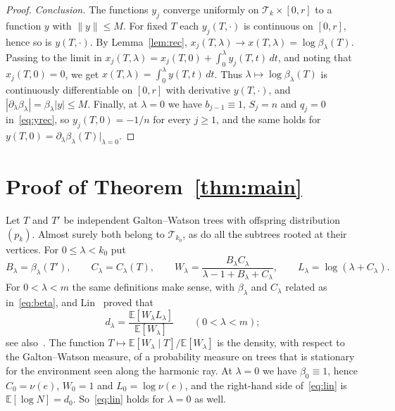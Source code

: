 \documentclass[11pt]{amsart}
\theoremstyle{definition}
\newcommand{\E}{\mathbb{E}}
\newcommand{\cT}{\mathcal{T}}
\begin{document}
\begin{proof}
\emph{Conclusion.} The functions $y_j$ converge uniformly on $\cT_k\times[0,r]$ to a function $y$ with
$\|y\|\le M$. For fixed $T$ each $y_j(T,\cdot)$ is continuous on $[0,r]$, hence so is $y(T,\cdot)$. By
Lemma~\ref{lem:rec}, $x_j(T,\lambda)\to x(T,\lambda)=\log\beta_\lambda(T)$. Passing to the limit in
$x_j(T,\lambda)=x_j(T,0)+\int_0^\lambda y_j(T,t)\,dt$, and noting that $x_j(T,0)=0$, we get
$x(T,\lambda)=\int_0^\lambda y(T,t)\,dt$. Thus $\lambda\mapsto\log\beta_\lambda(T)$ is continuously
differentiable on $[0,r]$ with derivative $y(T,\cdot)$, and
$|\partial_\lambda\beta_\lambda|=\beta_\lambda|y|\le M$. Finally, at $\lambda=0$ we have $b_{j-1}\equiv1$,
$S_j=n$ and $q_j=0$ in~\eqref{eq:yrec}, so $y_j(T,0)=-1/n$ for every $j\ge1$, and the same holds for
$y(T,0)=\partial_\lambda\beta_\lambda(T)|_{\lambda=0}$.
\end{proof}

\section{Proof of Theorem~\ref{thm:main}}\label{sec:proof}

Let $T$ and $T'$ be independent Galton--Watson trees with offspring distribution $(p_k)$. Almost surely both
belong to $\cT_{k_0}$, as do all the subtrees rooted at their vertices. For $0\le\lambda<k_0$ put
\[
   B_\lambda=\beta_\lambda(T'),\qquad C_\lambda=C_\lambda(T),\qquad
   W_\lambda=\frac{B_\lambda C_\lambda}{\lambda-1+B_\lambda+C_\lambda},\qquad L_\lambda=\log(\lambda+C_\lambda).
\]
For $0<\lambda<m$ the same definitions make sense, with $\beta_\lambda$ and $C_\lambda$ related as
in~\eqref{eq:beta}, and Lin~\cite[formulas (7) and (8) and the display that follows (9)]{Lin} proved that
\begin{equation}\label{eq:lin}
   d_\lambda=\frac{\E[W_\lambda L_\lambda]}{\E[W_\lambda]}\qquad(0<\lambda<m);
\end{equation}
see also~\cite[Theorem~4.1]{Rousselin}. The function $T\mapsto\E[W_\lambda\mid T]/\E[W_\lambda]$ is the density,
with respect to the Galton--Watson measure, of a probability measure on trees that is stationary for the
environment seen along the harmonic ray. At $\lambda=0$ we have $\beta_0\equiv1$, hence $C_0=\nu(e)$, $W_0=1$ and
$L_0=\log\nu(e)$, and the right-hand side of~\eqref{eq:lin} is $\E[\log N]=d_0$. So~\eqref{eq:lin} holds for
$\lambda=0$ as well.
\end{document}
